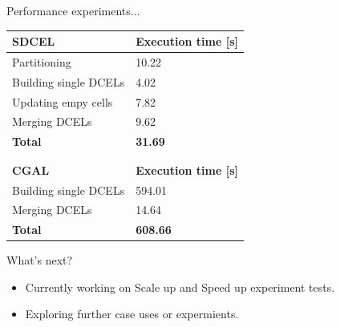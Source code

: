 \documentclass{beamer}
\begin{document}
\begin{frame}{Performance experiments...}
    \centering
    \begin{tabular}{ll}
        \hline
        \textbf{SDCEL} & \textbf{Execution time [s]} \\
        \hline
        Partitioning & 10.22 \\
        Building single DCELs & 4.02 \\
        Updating empy cells & 7.82 \\
        Merging DCELs & 9.62 \\
        \textbf{Total} & \textbf{31.69} \\
        \hline \\
        & \\
        \hline
        \textbf{CGAL} & \textbf{Execution time [s]} \\
        Building single DCELs & 594.01 \\
        Merging DCELs & 14.64 \\
        \textbf{Total} & \textbf{608.66} \\
        \hline
    \end{tabular} 
\end{frame}

\begin{frame}{What's next?}
    \begin{itemize}
        \item Currently working on Scale up and Speed up experiment tests.
        \item Exploring further case uses or expermients.
    \end{itemize}
\end{frame}
\end{document}
